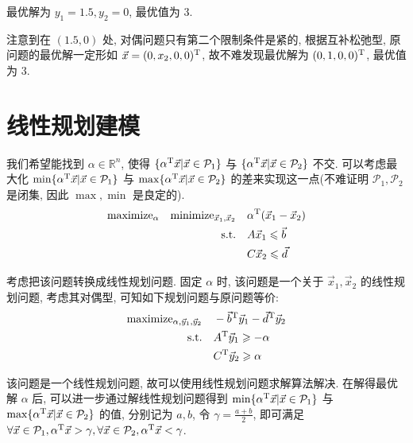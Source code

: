 \documentclass[8pt]{article}
\theoremstyle{compact}
\def\le{\leqslant}
\def\ge{\geqslant}
\begin{document}
最优解为 $y_1 = 1.5, y_2 = 0$, 最优值为 $3$.

注意到在 $(1.5, 0)$ 处, 对偶问题只有第二个限制条件是紧的, 根据互补松弛型, 原问题的最优解一定形如 $\vec x = (0, x_2, 0, 0)^{\text T}$, 故不难发现最优解为 $(0, 1, 0, 0)^{\text T}$, 最优值为 $3$.

\section{线性规划建模}

我们希望能找到 $\alpha \in \mathbb R^n$, 使得 $\{\alpha^{\text T}\vec x | \vec x \in \mathcal P_1\}$ 与 $\{\alpha^{\text T}\vec x | \vec x \in \mathcal P_2\}$ 不交. 可以考虑最大化 $\min \{\alpha^{\text T}\vec x | \vec x \in \mathcal P_1\}$ 与 $\max\{\alpha^{\text T}\vec x | \vec x \in \mathcal P_2\}$ 的差来实现这一点(不难证明 $\mathcal P_1, \mathcal P_2$ 是闭集, 因此 $\max, \min$ 是良定的).
\begin{equation*}
	\begin{split}
		\text{maximize}_{\alpha} \quad \text{minimize}_{\vec{x}_1, \vec{x}_2} \quad & \alpha^{\text T}(\vec{x}_1 - \vec{x}_2) \\
		\text{s.t.} \quad & A\vec{x}_1 \le \vec b\\
		& C\vec{x}_2 \le \vec d \\
	\end{split}
\end{equation*}

考虑把该问题转换成线性规划问题. 固定 $\alpha$ 时, 该问题是一个关于 $\vec x_1, \vec x_2$ 的线性规划问题, 考虑其对偶型, 可知如下规划问题与原问题等价:
\begin{equation*}
	\begin{split}
		\text{maximize}_{\alpha, \vec y_1, \vec y_2} \quad & -\vec b^{\text T}\vec y_1 - \vec d^{\text T}\vec y_2 \\
		\text{s.t.} \quad & A^{\text T}\vec{y}_1 \ge -\alpha\\
		& C^{\text T}\vec{y}_2 \ge \alpha \\
	\end{split}
\end{equation*}

该问题是一个线性规划问题, 故可以使用线性规划问题求解算法解决. 在解得最优解 $\alpha$ 后, 可以进一步通过解线性规划问题得到 $\min\{\alpha^{\text T}\vec x | \vec x \in \mathcal P_1\}$ 与 $\max\{\alpha^{\text T}\vec x | \vec x \in \mathcal P_2\}$ 的值, 分别记为 $a, b$, 令 $\gamma = \frac{a+b}{2}$, 即可满足 $\forall \vec x \in \mathcal P_1, \alpha^{\text T}\vec x > \gamma, \forall \vec x \in \mathcal P_2, \alpha^{\text T}\vec x < \gamma$.
\end{document}
